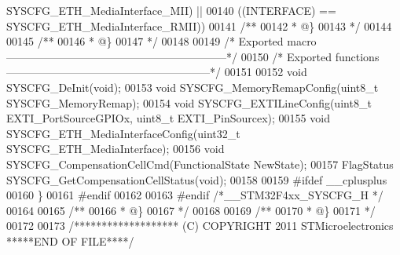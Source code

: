 \begin{DoxyCode}
      SYSCFG_ETH_MediaInterface_MII\textcolor{preprocessor}{)} \textcolor{preprocessor}{||}
00140                                                 \textcolor{preprocessor}{(}\textcolor{preprocessor}{(}\textcolor{preprocessor}{INTERFACE}\textcolor{preprocessor}{)} \textcolor{preprocessor}{==} 
      SYSCFG_ETH_MediaInterface_RMII\textcolor{preprocessor}{)}\textcolor{preprocessor}{)}
00141 \textcolor{comment}{/**}
00142 \textcolor{comment}{  * @\}}
00143 \textcolor{comment}{  */}
00144 
00145 \textcolor{comment}{/**}
00146 \textcolor{comment}{  * @\}}
00147 \textcolor{comment}{  */}
00148 
00149 \textcolor{comment}{/* Exported macro ------------------------------------------------------------*/}
00150 \textcolor{comment}{/* Exported functions --------------------------------------------------------*/}
00151 
00152 \textcolor{keywordtype}{void} SYSCFG_DeInit(\textcolor{keywordtype}{void});
00153 \textcolor{keywordtype}{void} SYSCFG_MemoryRemapConfig(uint8\_t SYSCFG\_MemoryRemap);
00154 \textcolor{keywordtype}{void} SYSCFG_EXTILineConfig(uint8\_t EXTI\_PortSourceGPIOx, uint8\_t EXTI\_PinSourcex);
00155 \textcolor{keywordtype}{void} SYSCFG_ETH_MediaInterfaceConfig(uint32\_t SYSCFG\_ETH\_MediaInterface);
00156 \textcolor{keywordtype}{void} SYSCFG_CompensationCellCmd(FunctionalState NewState);
00157 FlagStatus SYSCFG_GetCompensationCellStatus(\textcolor{keywordtype}{void});
00158 
00159 \textcolor{preprocessor}{#}\textcolor{preprocessor}{ifdef} \_\_cplusplus
00160 \}
00161 \textcolor{preprocessor}{#}\textcolor{preprocessor}{endif}
00162 
00163 \textcolor{preprocessor}{#}\textcolor{preprocessor}{endif} \textcolor{comment}{/*\_\_STM32F4xx\_SYSCFG\_H */}
00164 
00165 \textcolor{comment}{/**}
00166 \textcolor{comment}{  * @\}}
00167 \textcolor{comment}{  */}
00168 
00169 \textcolor{comment}{/**}
00170 \textcolor{comment}{  * @\}}
00171 \textcolor{comment}{  */}
00172 
00173 \textcolor{comment}{/******************* (C) COPYRIGHT 2011 STMicroelectronics *****END OF FILE****/}
\end{DoxyCode}
